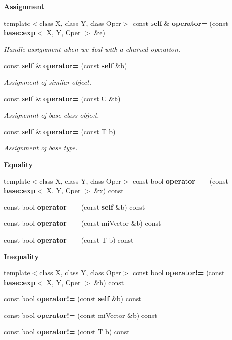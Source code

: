 \begin{Indent}{\bf Assignment}\par
\begin{CompactItemize}
\item 
template$<$class X, class Y, class Oper$>$ const {\bf self} \& {\bf operator=} (const {\bf base::exp}$<$ X, Y, Oper $>$ \&e)
\begin{CompactList}\small\item\em Handle assignment when we deal with a chained operation. \item\end{CompactList}\item 
const {\bf self} \& {\bf operator=} (const {\bf self} \&b)
\begin{CompactList}\small\item\em Assignment of similar object. \item\end{CompactList}\item 
const {\bf self} \& {\bf operator=} (const C \&b)
\begin{CompactList}\small\item\em Assignemnt of base class object. \item\end{CompactList}\item 
const {\bf self} \& {\bf operator=} (const T b)
\begin{CompactList}\small\item\em Assignment of base type. \item\end{CompactList}\end{CompactItemize}
\end{Indent}
\begin{Indent}{\bf Equality}\par
\begin{CompactItemize}
\item 
template$<$class X, class Y, class Oper$>$ const bool {\bf operator==} (const {\bf base::exp}$<$ X, Y, Oper $>$ \&x) const 
\item 
const bool {\bf operator==} (const {\bf self} \&b) const 
\item 
const bool {\bf operator==} (const mi\-Vector \&b) const 
\item 
const bool {\bf operator==} (const T b) const 
\end{CompactItemize}
\end{Indent}
\begin{Indent}{\bf Inequality}\par
\begin{CompactItemize}
\item 
template$<$class X, class Y, class Oper$>$ const bool {\bf operator!=} (const {\bf base::exp}$<$ X, Y, Oper $>$ \&b) const 
\item 
const bool {\bf operator!=} (const {\bf self} \&b) const 
\item 
const bool {\bf operator!=} (const mi\-Vector \&b) const 
\item 
const bool {\bf operator!=} (const T b) const 
\end{CompactItemize}
\end{Indent}
